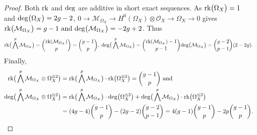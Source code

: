 \documentclass[10pt]{amsart}
\theoremstyle{definition}
\begin{document}
\begin{proof}
Both ${\rm rk}$ and ${\rm deg}$ are additive in short exact sequences. As ${\rm rk}\big(\Omega_X\big)=1$ and ${\rm deg}\big(\Omega_X\big)=2g-2$, $0\rightarrow \mathcal{M}_{\Omega_X}\rightarrow H^0(\Omega_X)\otimes\mathcal{O}_X\rightarrow {\Omega}_X\rightarrow 0$ gives ${\rm rk}\big(\mathcal{M}_{\Omega_X}\big)=g-1\text{ and }{\rm deg}\big(\mathcal{M}_{\Omega_X}\big)=-2g+2$. Thus
\[
{\rm rk}\big(\bigwedge^p\mathcal{M}_{\Omega_X}\big)=\binom{{\rm rk}(\mathcal{M}_{\Omega_X})}{p}
=\binom{g-1}{p}
,\;
{\rm deg}\big(\bigwedge^p\mathcal{M}_{\Omega_X}\big)
=
\binom{{\rm rk}(\mathcal{M}_{\Omega_X})-1}{p-1}{\rm deg}\big(\mathcal{M}_{\Omega_X}\big)
=
\binom{g-2}{p-1}(2-2g).
\]
Finally,
\begin{align*}
{\rm rk}\big(\bigwedge^p\mathcal{M}_{\Omega_X}\otimes \Omega_X^{\otimes 2}\big)
&=
{\rm rk}\big(\bigwedge^p\mathcal{M}_{\Omega_X}\big)\cdot{\rm rk}\big(\Omega_X^{\otimes 2}\big)=\binom{g-1}{p}\text{ and }\\
{\rm deg}\big(\bigwedge^p\mathcal{M}_{\Omega_X}\otimes \Omega_X^{\otimes 2}\big)
&=
{\rm rk}\big(\bigwedge^p\mathcal{M}_{\Omega_X}\big)\cdot{\rm deg}\big(\Omega_X^{\otimes 2}\big)
+
{\rm deg}\big(\bigwedge^p\mathcal{M}_{\Omega_X}\big)\cdot{\rm rk}\big(\Omega_X^{\otimes 2}\big)
\\
&=
(4g-4)\binom{g-1}{p}-(2g-2)\binom{g-2}{p-1}=
4(g-1)\binom{g-1}{p}-2p\binom{g-1}{p}.
\end{align*}
\end{proof}
\end{document}
